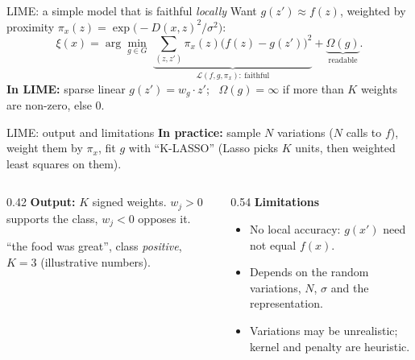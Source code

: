 \documentclass[aspectratio=169,11pt]{beamer}
\begin{document}
\begin{frame}{LIME: a simple model that is faithful \emph{locally}}
  \pause
  \vspace{0.2em}
  Want $g(z')\approx f(z)$, weighted by proximity
  $\pi_x(z)=\exp\bigl(-D(x,z)^2/\sigma^2\bigr)$:
  \[
    \xi(x)=\arg\min_{g\in G}\;
    \underbrace{\sum_{(z,z')}\pi_x(z)\bigl(f(z)-g(z')\bigr)^2}_{\mathcal{L}(f,g,\pi_x):\ \text{faithful}}
    +\underbrace{\Omega(g)}_{\text{readable}} .
  \]
  {\small
  \pause
  \textbf{In LIME:} sparse linear $g(z')=w_g\cdot z'$;
  \ $\Omega(g)=\infty$ if more than $K$ weights are non-zero, else $0$.
  }
\end{frame}

\begin{frame}{LIME: output and limitations}
  \vspace{0.3em}
  {\small
  \textbf{In practice:} sample $N$ variations ($N$ calls to $f$),
  weight them by $\pi_x$, fit $g$ with ``K-LASSO''
  (Lasso picks $K$ units, then weighted least squares on them).
  }

  \vspace{0.4em}
  \begin{columns}[T]
    \begin{column}{0.42\textwidth}
      \pause
      {\small
      \textbf{Output:} $K$ signed weights.
      \textcolor{red!70!black}{$w_j>0$} supports the class,
      \textcolor{blue!70!black}{$w_j<0$} opposes it.
      }

      \vspace{0.3em}
      \centering

      {\scriptsize ``the food was great'', class \emph{positive},
      $K=3$ (illustrative numbers).}
    \end{column}
    \begin{column}{0.54\textwidth}
      \pause
      \textbf{Limitations}
      {\small
      \begin{itemize}
        \item No local accuracy: $g(x')$ need not equal $f(x)$.
        \pause
        \item Depends on the random variations, $N$, $\sigma$
          and the representation.
        \pause
        \item Variations may be unrealistic;
          kernel and penalty are heuristic.
      \end{itemize}
      }
    \end{column}
  \end{columns}


\end{frame}
\end{document}
